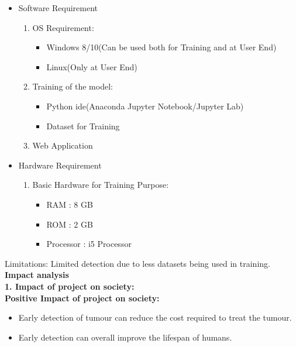 \begin{itemize}
    \item Software Requirement 
        \begin{enumerate}
            \item OS Requirement:
                \begin{itemize}
                    \item Windows 8/10(Can be used both for Training and at User End)
                    \item Linux(Only at User End)
                \end{itemize}
            \item Training of the model:
                \begin{itemize}
                    \item Python ide(Anaconda Jupyter Notebook/Jupyter Lab)
                    \item Dataset for Training
                \end{itemize} 
            \item Web Application
        \end{enumerate}
    \item Hardware Requirement
        \begin{enumerate}
            \item Basic Hardware for Training Purpose:
                \begin{itemize}
                    \item RAM : 8 GB
                    \item ROM : 2 GB
                    \item Processor : i5 Processor
                \end{itemize}
        \end{enumerate}
    \end{itemize}
Limitations: Limited detection due to less datasets being used in training.\\
{\bf \Large Impact analysis}\\
{\textbf{1. Impact of project on society:}}\\
{\textbf{Positive Impact of project on society:}}
\begin{itemize}
    \item Early detection of tumour can reduce the cost required to treat the tumour.
    \item Early detection can overall improve the lifespan of humans.
\end{itemize}\\ 
